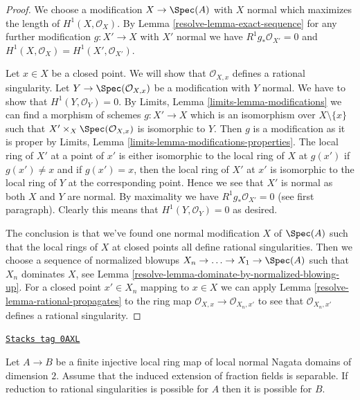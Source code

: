 \begin{proof}

We choose a modification $X \to \Spec(A)$ with $X$ normal
which maximizes the length of $H^1(X, \mathcal{O}_X)$.
By Lemma \ref{resolve-lemma-exact-sequence}
for any further modification $g : X' \to X$ with $X'$ normal
we have $R^1g_*\mathcal{O}_{X'} = 0$ and
$H^1(X, \mathcal{O}_X) = H^1(X', \mathcal{O}_{X'})$.

\medskip\noindent
Let $x \in X$ be a closed point. We will show that $\mathcal{O}_{X, x}$
defines a rational singularity. Let $Y \to \Spec(\mathcal{O}_{X, x})$
be a modification with $Y$ normal. We have to show that
$H^1(Y, \mathcal{O}_Y) = 0$. By
Limits, Lemma \ref{limits-lemma-modifications}
we can find a morphism of schemes $g : X' \to X$ which is an isomorphism
over $X \setminus \{x\}$ such that $X' \times_X \Spec(\mathcal{O}_{X, x})$
is isomorphic to $Y$. Then $g$ is a modification as it is proper by
Limits, Lemma \ref{limits-lemma-modifications-properties}.
The local ring of $X'$ at a point of $x'$ is either isomorphic
to the local ring of $X$ at $g(x')$ if $g(x') \not = x$ and
if $g(x') = x$, then the local ring of $X'$ at $x'$ is isomorphic
to the local ring of $Y$ at the corresponding point. Hence we see
that $X'$ is normal as both $X$ and $Y$ are normal. By maximality
we have $R^1g_*\mathcal{O}_{X'} = 0$ (see first paragraph). Clearly
this means that $H^1(Y, \mathcal{O}_Y) = 0$ as desired.

\medskip\noindent
The conclusion is that we've found one normal modification $X$
of $\Spec(A)$ such that the local rings of $X$ at closed points all define
rational singularities. Then we choose a sequence of normalized
blowups $X_n \to \ldots \to X_1 \to \Spec(A)$ such that $X_n$
dominates $X$, see Lemma \ref{resolve-lemma-dominate-by-normalized-blowing-up}.
For a closed point $x' \in X_n$ mapping to $x \in X$ we can apply
Lemma \ref{resolve-lemma-rational-propagates} to the ring map
$\mathcal{O}_{X, x} \to \mathcal{O}_{X_n, x'}$
to see that $\mathcal{O}_{X_n, x'}$ defines a rational singularity.
\end{proof}

\begin{lemma}[Go up separable]
\label{resolve-lemma-go-up-separable}
\href{https://stacks.math.columbia.edu/tag/0AXL}{\texttt{Stacks tag 0AXL}}

Let $A \to B$ be a finite injective local ring map of local normal
Nagata domains of dimension $2$. Assume that the induced extension of
fraction fields is separable. If reduction to rational singularities
is possible for $A$ then it is possible for $B$.
\end{lemma}

